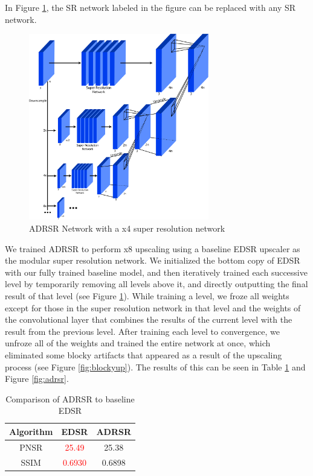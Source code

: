 \documentclass[10pt,twocolumn,letterpaper]{article}
\begin{document}
In Figure \ref{fig:multscalenet}, the SR network labeled in the figure can be replaced with any SR network. 

\begin{figure}[ht!]
\centering
\includegraphics[width=0.70\textwidth]{Images/MultipleScaleNet.png}
\caption{ADRSR Network with a x4 super resolution network
\label{fig:multscalenet}}
\end{figure}

We trained ADRSR to perform x8 upscaling using a baseline EDSR upscaler as the modular super resolution network. We initialized the bottom copy of EDSR with our fully trained baseline model, and then iteratively trained each successive level by temporarily removing all levels above it, and directly outputting the final result of that level (see Figure \ref{fig:multscalenet}). While training a level, we froze all weights except for those in the super resolution network in that level and the weights of the convolutional layer that combines the results of the current level with the result from the previous level. After training each level to convergence, we unfroze all of the weights and trained the entire network at once, which eliminated some blocky artifacts that appeared as a result of the upscaling process (see Figure \ref{fig:blockyup}). The results of this can be seen in Table \ref{tbl:adrsr} and Figure \ref{fig:adrsr}.

\begin{table}[ht!]
    \centering
    \begin{tabular}{c|c|c}
       \footnotesize{Algorithm}  & \footnotesize{EDSR} & \footnotesize{ADRSR}\\ \hline
        \footnotesize{PNSR} & \textcolor{red}{25.49} & 25.38\\
        \footnotesize{SSIM} & \textcolor{red}{0.6930} & 0.6898\\
    \end{tabular}
    \caption{Comparison of ADRSR to baseline EDSR
    \label{tbl:adrsr}}
\end{table}
\end{document}
